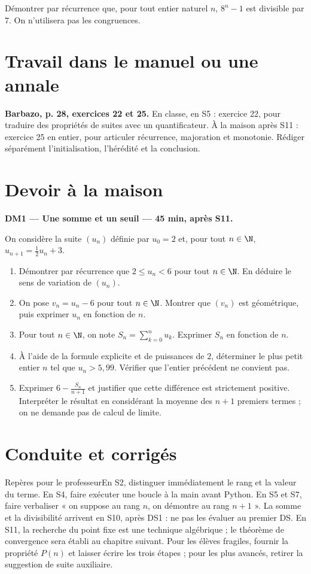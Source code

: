 Démontrer par récurrence que, pour tout entier naturel $n$, $8^n-1$ est divisible par $7$. On n'utilisera pas les congruences.

\section{Travail dans le manuel ou une annale}\textbf{Barbazo, p. 28, exercices 22 et 25.} En classe, en S5 : exercice 22, pour traduire des propriétés de suites avec un quantificateur. À la maison après S11 : exercice 25 en entier, pour articuler récurrence, majoration et monotonie. Rédiger séparément l'initialisation, l'hérédité et la conclusion.

\section{Devoir à la maison}\textbf{DM1 --- Une somme et un seuil --- 45 min, après S11.}\par On considère la suite $(u_n)$ définie par $u_0=2$ et, pour tout $n\in\N$, $u_{n+1}=\frac12u_n+3$.
\begin{enumerate}\item Démontrer par récurrence que $2\le u_n<6$ pour tout $n\in\N$. En déduire le sens de variation de $(u_n)$.
\item On pose $v_n=u_n-6$ pour tout $n\in\N$. Montrer que $(v_n)$ est géométrique, puis exprimer $u_n$ en fonction de $n$.
\item Pour tout $n\in\N$, on note $S_n=\displaystyle\sum_{k=0}^n u_k$. Exprimer $S_n$ en fonction de $n$.
\item À l'aide de la formule explicite et de puissances de $2$, déterminer le plus petit entier $n$ tel que $u_n>5{,}99$. Vérifier que l'entier précédent ne convient pas.
\item Exprimer $6-\frac{S_n}{n+1}$ et justifier que cette différence est strictement positive. Interpréter le résultat en considérant la moyenne des $n+1$ premiers termes ; on ne demande pas de calcul de limite.\end{enumerate}

\ifprof\clearpage\section{Conduite et corrigés}\begin{profbox}{Repères pour le professeur}En S2, distinguer immédiatement le rang et la valeur du terme. En S4, faire exécuter une boucle à la main avant Python. En S5 et S7, faire verbaliser « on suppose au rang $n$, on démontre au rang $n+1$ ». La somme et la divisibilité arrivent en S10, après DS1 : ne pas les évaluer au premier DS. En S11, la recherche du point fixe est une technique algébrique ; le théorème de convergence sera établi au chapitre suivant. Pour les élèves fragiles, fournir la propriété $P(n)$ et laisser écrire les trois étapes ; pour les plus avancés, retirer la suggestion de suite auxiliaire.\end{profbox}

